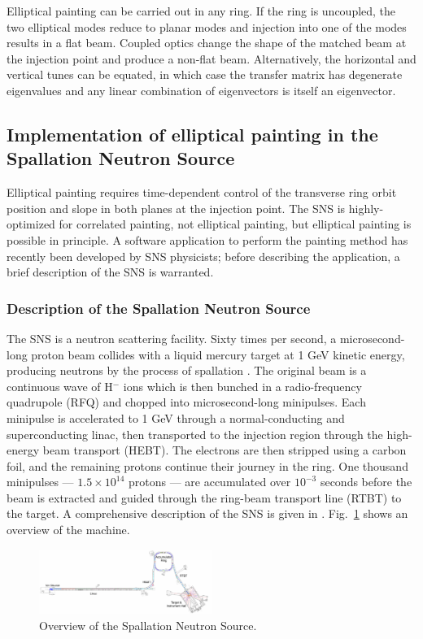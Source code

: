Elliptical painting can be carried out in any ring. If the ring is uncoupled, the two elliptical modes reduce to planar modes and injection into one of the modes results in a flat beam. Coupled optics change the shape of the matched beam at the injection point and produce a non-flat beam. Alternatively, the horizontal and vertical tunes can be equated, in which case the transfer matrix has degenerate eigenvalues and any linear combination of eigenvectors is itself an eigenvector. 


\subsection{Implementation of elliptical painting in the Spallation Neutron Source}

Elliptical painting requires time-dependent control of the transverse ring orbit position and slope in both planes at the injection point. The SNS is highly-optimized for correlated painting, not elliptical painting, but elliptical painting is possible in principle. A software application to perform the painting method has recently been developed by SNS physicists; before describing the application, a brief description of the SNS is warranted. 

\subsubsection{Description of the Spallation Neutron Source}

The SNS is a neutron scattering facility. Sixty times per second, a microsecond-long proton beam collides with a liquid mercury target at 1 GeV kinetic energy, producing neutrons by the process of spallation \cite{Russell1990}. The original beam is a continuous wave of H$^-$ ions which is then bunched in a radio-frequency quadrupole (RFQ) and chopped into microsecond-long minipulses. Each minipulse is accelerated to 1 GeV through a normal-conducting and superconducting linac, then transported to the injection region through the high-energy beam transport (HEBT). The electrons are then stripped using a carbon foil, and the remaining protons continue their journey in the ring. One thousand minipulses — $1.5 \times 10^{14}$ protons — are accumulated over $10^{-3}$ seconds before the beam is extracted and guided through the ring-beam transport line (RTBT) to the target. A comprehensive description of the SNS is given in \cite{Henderson2014}. Fig.~\ref{fig:SNS} shows an overview of the machine.
%
\begin{figure}[!p]
    \centering
    \includegraphics[angle=-90, width=0.5\textwidth]{Images/chapter1/SNS.png}
    \caption{Overview of the Spallation Neutron Source.}
    \label{fig:SNS}
\end{figure}
%

